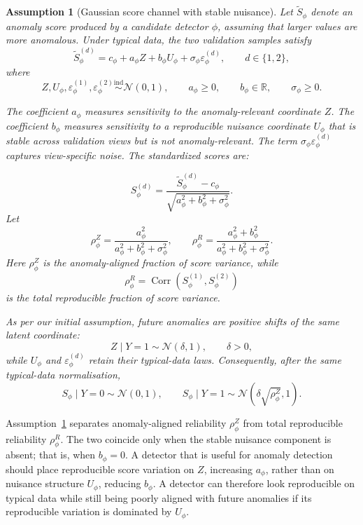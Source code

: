 \documentclass[11pt]{article}
\newtheorem{assumption}{Assumption}
\newcommand{\R}{\mathbb{R}}
\newcommand{\Normal}{\mathcal{N}}
\newcommand{\Corr}{\operatorname{Corr}}
\begin{document}
\begin{assumption}[Gaussian score channel with stable nuisance]
\label{ass:channel}
Let \(\widetilde S_\phi\) denote an anomaly score produced
by a candidate detector \(\phi\), assuming that larger values are
more anomalous. Under typical data, the two validation samples satisfy
\[
    \widetilde S_\phi^{(d)}
    =
    c_\phi
    +
    a_\phi Z
    +
    b_\phi U_\phi
    +
    \sigma_\phi \varepsilon_\phi^{(d)},
    \qquad d\in\{1,2\},
\]
where
\[
    Z,U_\phi,\varepsilon_\phi^{(1)},\varepsilon_\phi^{(2)}
    \stackrel{\mathrm{ind}}{\sim}\Normal(0,1),
    \qquad
    a_\phi\ge 0,
    \qquad
    b_\phi\in\R,
    \qquad
    \sigma_\phi\ge 0.
\]

The coefficient \(a_\phi\) measures sensitivity to the anomaly-relevant
coordinate \(Z\). The coefficient \(b_\phi\) measures sensitivity to a
reproducible nuisance coordinate \(U_\phi\) that is stable across validation
views but is not anomaly-relevant. The term
\(\sigma_\phi \varepsilon_\phi^{(d)}\) captures view-specific noise. The
standardized scores are:

\[
    S_\phi^{(d)}
    =
    \frac{\widetilde S_\phi^{(d)}-c_\phi}
    {\sqrt{a_\phi^2+b_\phi^2+\sigma_\phi^2}} .
\]
Let
\[
    \rho_{\phi}^{Z}
    =
    \frac{a_\phi^2}{a_\phi^2+b_\phi^2+\sigma_\phi^2},
    \qquad
    \rho_{\phi}^{R}
    =
    \frac{a_\phi^2+b_\phi^2}{a_\phi^2+b_\phi^2+\sigma_\phi^2}.
\]
Here \(\rho_{\phi}^{Z}\) is the anomaly-aligned fraction of score variance,
while
\[
    \rho_{\phi}^{R}
    =
    \Corr(S_\phi^{(1)},S_\phi^{(2)})
\]
is the total reproducible fraction of score variance.

As per our initial assumption, future anomalies are positive shifts of the same latent coordinate:
\[
    Z\mid Y=1\sim\Normal(\delta,1),
    \qquad
    \delta>0,
\]
while \(U_\phi\) and \(\varepsilon_\phi^{(d)}\) retain their typical-data laws.
Consequently, after the same typical-data normalisation,
\[
    S_\phi\mid Y=0\sim\Normal(0,1),
    \qquad
    S_\phi\mid Y=1\sim\Normal(\delta\sqrt{\rho_\phi^Z},1).
\]
\end{assumption}

Assumption~\ref{ass:channel} separates anomaly-aligned reliability
\(\rho_\phi^Z\) from total reproducible reliability \(\rho_\phi^R\). The two
coincide only when the stable nuisance component is absent; that is, when \(b_\phi=0\). A detector that is
useful for anomaly detection should place reproducible score variation on
\(Z\), increasing \(a_\phi\), rather than on nuisance structure \(U_\phi\),
reducing \(b_\phi\). A detector can therefore look reproducible on typical data
while still being poorly aligned with future anomalies if its reproducible
variation is dominated by \(U_\phi\).
\end{document}
